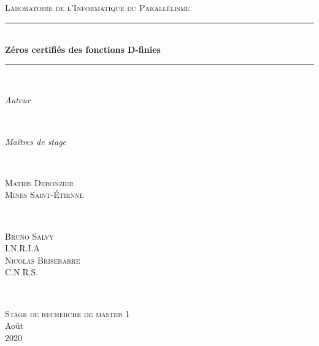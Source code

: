 \documentclass[a4paper,10pt]{article}
\begin{document}
	\hypersetup{pdfborder=0 0 0}
	\newcommand{\HRule}{\rule{\linewidth}{0.5mm}}
	\textsc{\LARGE Laboratoire de l'Informatique du Parallélisme}\\[1.5cm] 
	\HRule \\[0.5cm]
	{ \huge \bfseries Zéros certifiés des fonctions D-finies  }\\[0.4cm] 
	\HRule \\[1.5cm]
	
	\begin{minipage}{0.4\textwidth}
		\begin{flushleft} \Large
			\emph{Auteur}\\
		\end{flushleft}
	\end{minipage}
	~
	\begin{minipage}{0.4\textwidth}
		\begin{flushright} \Large
			\emph{Maîtres de stage} \\
		\end{flushright}
	\end{minipage}\\[0.5 cm]
	\begin{minipage}{0.4\textwidth}
		\begin{flushleft} \large
			\textsc{Mathis Deronzier}\\
			\textsc{Mines Saint-Étienne}
		\end{flushleft}
	\end{minipage}
	~
	\begin{minipage}{0.4\textwidth}
		\begin{flushright} \large
			\textsc{Bruno Salvy}\\
			\textsc{I.N.R.I.A}\\
			\textsc{Nicolas Brisebarre }\\
			\textsc{C.N.R.S.}
		\end{flushright}
	\end{minipage}\\[2cm]
	\begin{center}
	\textsc{\Large Stage de recherche de master 1 }\\[0.5cm]  
	\large Août \\2020\\[2cm]
	\end{center}
	\renewcommand{\contentsname}{Sommaire}
	\newpage
	\tableofcontents
	\newpage
	\renewcommand {\algorithmicrequire } {\textbf{\textsc{Entrée(s):} } }
	\renewcommand {\algorithmicensure } {\textbf{\textsc{Sortie:} } }
	\renewcommand {\algorithmicwhile } {\textbf{Tant que} }
	\renewcommand {\algorithmicdo } {\textbf{faire} }
	\renewcommand {\algorithmicendwhile } {\textbf{fin du Tant que} }
	\renewcommand {\algorithmicif } {\textbf{Si} }
	\renewcommand {\algorithmicfor } {\textbf{Pour} }
	\renewcommand {\algorithmicendfor } {\textbf{fin du Pour} }
	\renewcommand {\algorithmicthen } {\textbf{alors} }
	\renewcommand {\algorithmicendif } {\textbf{fin du Si} }
	\renewcommand {\algorithmicelse } {\textbf{Sinon} }
	\renewcommand {\algorithmicreturn } {\textbf{Renvoyer} }
	\newtheorem{theorem}{Théorème}[section] 
	\newtheorem{proposition}{Proposition}
	\newtheorem{corollaire}{Corollaire}
	\newtheorem{definition}{Définition}
	\newtheorem{remarque}{Remarque}
	\setcounter{section}{-1}
\end{document}
